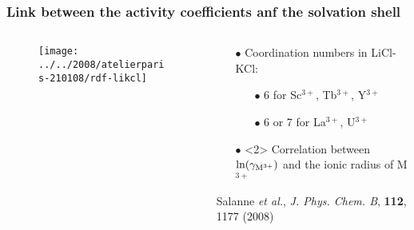 \documentclass{beamer}
\begin{document}
\begin{frame}
   \frametitle{Link between the activity coefficients anf the solvation shell}
   \begin{columns}
      \begin{column}{6cm}
         \vspace{-0.5cm}
         \begin{figure}
            \texttt{[image: ../../2008/atelierparis-210108/rdf-likcl]}
         \end{figure}
      \end{column}
      \begin{column}{6cm}
         \begin{itemize}
            \item[$\bullet$] Coordination numbers in LiCl-KCl:
                  \begin{itemize}
                     \item[$\bullet$] 6 for Sc$^{3+}$, Tb$^{3+}$, Y$^{3+}$
                     \item[$\bullet$] 6 or 7 for La$^{3+}$, U$^{3+}$
                  \end{itemize}
            \vspace{2cm}
            \item[$\bullet$]<2> Correlation between $\ln(\gamma_{{\rm M}^{3+}})$ and the ionic radius of M$^{3+}$
         \end{itemize}
            \vspace{2cm}
   \scriptsize{Salanne {\it et al.}, {\it J. Phys. Chem. B}, {\bf 112}, 1177 (2008)}
      \end{column}
   \end{columns}
\end{frame}
\end{document}
